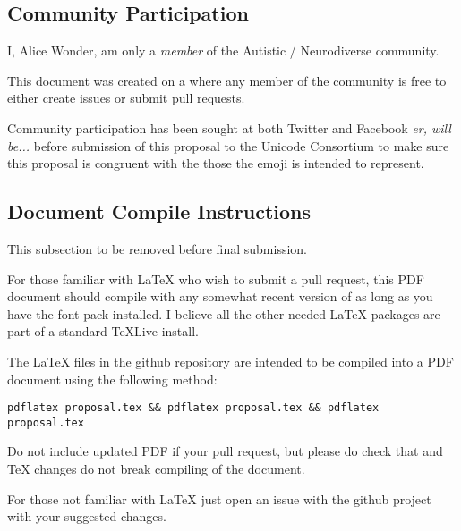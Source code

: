 \subsection*{Community Participation}

I, Alice Wonder, am only a \emph{member} of the Autistic / Neurodiverse community.

This document was created on a
where any member of the community is free to either create issues or submit pull
requests.

Community participation has been sought at both Twitter and Facebook \emph{er, will be...}
before submission of this proposal to the Unicode Consortium to make sure this proposal is
congruent with the those the emoji is intended to represent.

\subsection*{Document Compile Instructions}
This subsection to be removed before final submission.

For those familiar with \LaTeX{} who wish to submit a pull request, this PDF document
should compile with any somewhat recent version of
 as long as you have the
 font pack installed. I believe
all the other needed \LaTeX{} packages are part of a standard \TeX{}Live install.

The \LaTeX{} files in the github repository are intended to be compiled into a PDF document
using the following method:

\begin{verbatim}
pdflatex proposal.tex && pdflatex proposal.tex && pdflatex proposal.tex
\end{verbatim}

Do not include updated PDF if your pull request, but please do check that and TeX changes
do not break compiling of the document.

For those not familiar with \LaTeX{} just open an issue with the github project with your
suggested changes.

